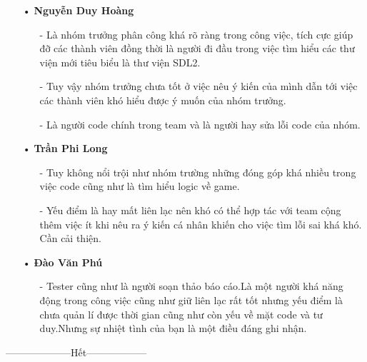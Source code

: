 \documentclass{article}
\begin{document}
\begin{itemize}
    \item [•]\textbf{Nguyễn Duy Hoàng}
    \begin{itemize}
        \item[-]Là nhóm trưởng phân công khá rõ ràng trong công việc, tích cực giúp đỡ các thành viên đồng thời là người đi đầu trong việc tìm hiểu các thư viện mới tiêu biểu là thư viện SDL2.
\item[-]Tuy vậy nhóm trưởng chưa tốt ở việc nêu ý kiến của mình dẫn tới việc các thành viên khó hiểu được ý muốn của nhóm trưởng. 
\item[-]Là người code chính trong team và là người hay sửa lỗi code của nhóm.

    \end{itemize}
    \newpage
    \item[•]\textbf{Trần Phi Long}
    \begin{itemize}
        \item[-]Tuy không nổi trội như nhóm trường những đóng góp khá nhiều trong việc code cũng như là tìm hiểu logic về game.
\item[-]Yếu điểm là hay mất liên lạc nên khó có thể hợp tác với team cộng thêm việc ít khi nêu ra ý kiến cá nhân khiến cho việc tìm lỗi sai khá khó. Cần cải thiện.

    \end{itemize}
    \item[•]\textbf{Đào Văn Phú}
    \begin{itemize}
        \item [-]Tester cũng như là người soạn thảo báo cáo.Là một người khá năng động trong công việc cũng như giữ liên lạc rất tốt nhưng yếu điểm là chưa quản lí được thời gian cũng như còn yếu về mặt code và tư duy.Nhưng sự nhiệt tình của bạn là một điều đáng ghi nhận.
    \end{itemize}
\end{itemize}
\begin{center}
    --------------------Hết------------------
\end{center}
\end{document}
